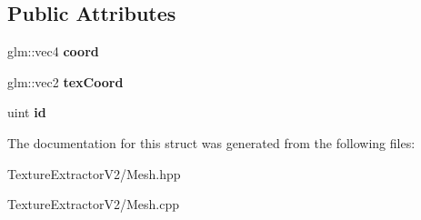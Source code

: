 \subsection*{Public Attributes}
\begin{DoxyCompactItemize}
\item 
\hypertarget{struct_vertex_aabc10e3b8e0171bcbe77b014944271b3}{}glm\+::vec4 {\bfseries coord}\label{struct_vertex_aabc10e3b8e0171bcbe77b014944271b3}

\item 
\hypertarget{struct_vertex_a8214ff52fee03a5524ce58c3810a1be9}{}glm\+::vec2 {\bfseries tex\+Coord}\label{struct_vertex_a8214ff52fee03a5524ce58c3810a1be9}

\item 
\hypertarget{struct_vertex_aee423a6a530f42da4d6a9b306fc348e7}{}uint {\bfseries id}\label{struct_vertex_aee423a6a530f42da4d6a9b306fc348e7}

\end{DoxyCompactItemize}


The documentation for this struct was generated from the following files\+:\begin{DoxyCompactItemize}
\item 
Texture\+Extractor\+V2/Mesh.\+hpp\item 
Texture\+Extractor\+V2/Mesh.\+cpp\end{DoxyCompactItemize}
